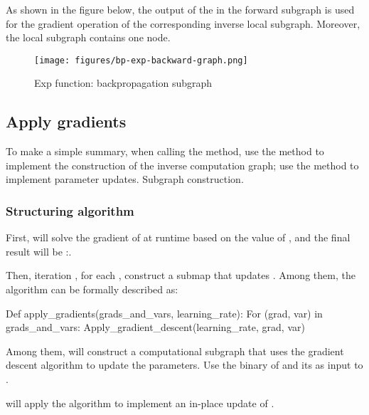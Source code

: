 \begin{content}
As shown in the figure below, the output of the  in the forward subgraph is used for the gradient operation of the corresponding inverse local subgraph. Moreover, the local subgraph contains one node.

\begin{figure}[!h]
  \centering
  \texttt{[image: figures/bp-exp-backward-graph.png]}
  \caption{Exp function: backpropagation subgraph}
  \label{fig:bp-exp-backward-graph}
\end{figure}


\subsection{Apply gradients}
To make a simple summary, when calling the  method, use the  method to implement the construction of the inverse computation graph; use the  method to implement parameter updates. Subgraph construction.


\subsubsection{Structuring algorithm}
First,  will solve the gradient of  at runtime based on the value of , and the final result will be :.

Then,  iteration , for each , construct a submap that updates . Among them, the algorithm can be formally described as:

\begin{leftbar}
\begin{python}
Def apply_gradients(grads_and_vars, learning_rate):
  For (grad, var) in grads_and_vars:
    Apply_gradient_descent(learning_rate, grad, var)
\end{python}
\end{leftbar}

Among them,  will construct a computational subgraph that uses the gradient descent algorithm to update the parameters. Use the binary of  and its  as input to .

 will apply the  algorithm to implement an in-place update of .


\end{content}
